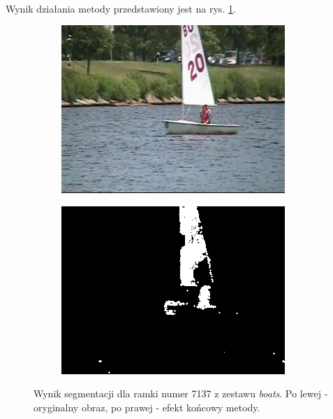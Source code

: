 \paragraph{}
Wynik działania metody przedstawiony jest na rys. \ref{fig:FTSG}.

\begin{figure}[!h]
\centering
\begin{subfigure}[b]{0.4\textwidth}
\includegraphics[width=\textwidth]{img/fg}
\caption{}
\end{subfigure}
\quad
\begin{subfigure}[b]{0.4\textwidth}
\includegraphics[width=\textwidth]{img/FTSG}
\caption{}
\end{subfigure}
\caption{Wynik segmentacji dla ramki numer 7137 z zestawu \textit{boats}. Po lewej - oryginalny obraz, po prawej - efekt końcowy metody.\label{fig:FTSG}}
\end{figure}

